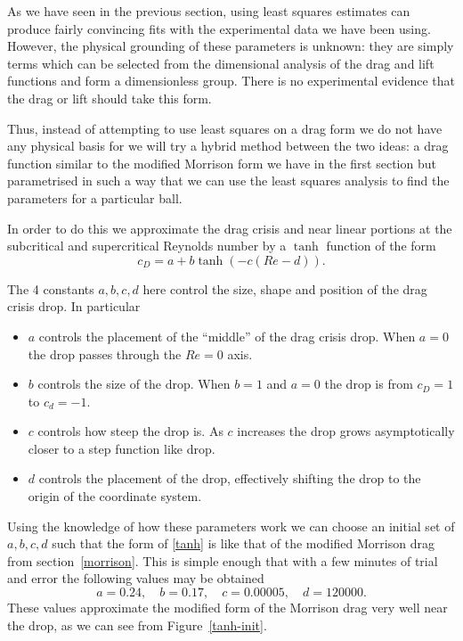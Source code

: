 As we have seen in the previous section, using least squares estimates can produce fairly convincing
fits with the experimental data we have been using. However, the physical grounding of these parameters
is unknown: they are simply terms which can be selected from the dimensional analysis of the drag 
and lift functions and form a dimensionless group. There is no experimental evidence that the drag or
lift should take this form.

Thus, instead of attempting to use least squares on a drag form we do not have any physical basis for
we will try a hybrid method between the two ideas: a drag function similar to the modified Morrison
form we have in the first section but parametrised in such a way that we can use the least squares
analysis to find the parameters for a particular ball.

In order to do this we approximate the drag crisis and near linear portions at the subcritical and 
supercritical Reynolds number by a $\tanh$ function of the form
\begin{equation} \label{tanh}
c_{D} = a + b \tanh (-c(Re - d)) .
\end{equation}

The 4 constants $a,b,c,d$ here control the size, shape and position of the drag crisis drop. In particular
\begin{itemize}
\item $a$ controls the placement of the ``middle'' of the drag crisis drop. When $a=0$ the drop passes
through the $Re = 0$ axis.
\item $b$ controls the size of the drop. When $b=1$ and $a=0$ the drop is from $c_D = 1$ to $c_d = -1$.
\item $c$ controls how steep the drop is. As $c$ increases the drop grows asymptotically closer to
a step function like drop.
\item $d$ controls the placement of the drop, effectively shifting the drop to the origin of the
coordinate system.
\end{itemize}

Using the knowledge of how these parameters work we can choose an initial set of $a,b,c,d$ such that
the form of \eqref{tanh} is like that of the modified Morrison drag from section~\ref{morrison}. This
is simple enough that with a few minutes of trial and error the following values may be obtained
\[
a = 0.24, \quad b = 0.17, \quad c = 0.00005, \quad d = 120000 .
\]
These values approximate the modified form of the Morrison drag very well near the drop, as we can see
from Figure~\ref{tanh-init}.


